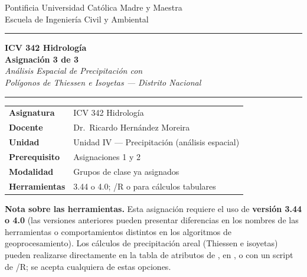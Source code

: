 \documentclass[11pt]{article}
\begin{document}
\begin{center}
  {\small\color{midgrey} Pontificia Universidad Católica Madre y Maestra\\
  Escuela de Ingeniería Civil y Ambiental}

  \vspace{1.4cm}
  {\color{olive}\rule{\linewidth}{2pt}}
  \vspace{0.3cm}

  {\Large\bfseries\color{darkblue} ICV 342 Hidrología}\\[0.4em]
  {\LARGE\bfseries\color{darkblue} Asignación 3 de 3}\\[0.3em]
  {\large\itshape Análisis Espacial de Precipitación con \qgis{}\\
  Polígonos de Thiessen e Isoyetas — Distrito Nacional}

  \vspace{0.3cm}
  {\color{olive}\rule{\linewidth}{2pt}}
  \vspace{1.0cm}
\end{center}

\begin{center}
\begin{tabular}{ll}
\toprule
\textbf{Asignatura}   & ICV 342 Hidrología \\
\textbf{Docente}  & Dr.\ Ricardo Hernández Moreira\\
\textbf{Unidad}       & Unidad IV — Precipitación (análisis espacial) \\
\textbf{Prerequisito} & Asignaciones 1 y 2 \\
\textbf{Modalidad}    & Grupos de clase ya asignados \\
\textbf{Herramientas} & \qgis{} 3.44 o 4.0; \python{}/R o \excel{} para cálculos tabulares \\
\bottomrule
\end{tabular}
\end{center}

\begin{warnbox}
\textbf{Nota sobre las herramientas.}
Esta asignación requiere el uso de \qgis{} \textbf{versión 3.44 o 4.0}
(las versiones anteriores pueden presentar diferencias en los nombres de las
herramientas o comportamientos distintos en los algoritmos de geoprocesamiento).
Los cálculos de precipitación areal (Thiessen e isoyetas) pueden realizarse
directamente en la tabla de atributos de \qgis{}, en \excel{}, o con un script
de \python{}/R; se acepta cualquiera de estas opciones.
\end{warnbox}
\end{document}
